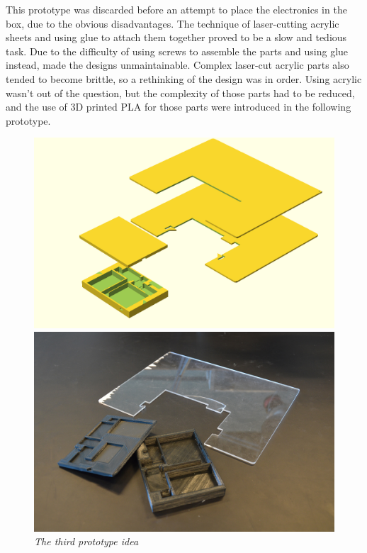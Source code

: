 This prototype was discarded before an attempt to place the electronics in the box, due to the obvious disadvantages. The technique of laser-cutting acrylic sheets and using glue to attach them together proved to be a slow and tedious task. Due to the difficulty of using screws to assemble the parts and using glue instead, made the designs unmaintainable. Complex laser-cut acrylic parts also tended to become brittle, so a rethinking of the design was in order. Using acrylic wasn't out of the question, but the complexity of those parts had to be reduced, and the use of 3D printed PLA for those parts were introduced in the following prototype.


\begin{figure}[h]
\begin{minipage}[b]{7.5cm}
\centering
\includegraphics[scale=0.235]{figures/iterations/v4.png}
\end{minipage}
\begin{minipage}[b]{7.5cm}
\centering
\includegraphics[scale=0.58]{figures/iterations/v4-photo.jpg}
\end{minipage}
\caption{\small {\it {The third prototype idea}}} \label{fig:v3}
\end{figure}

